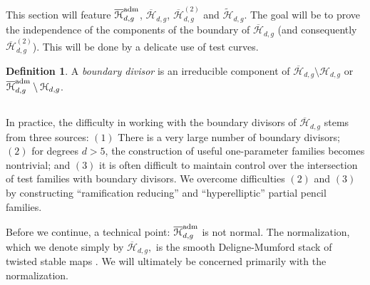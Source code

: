 \documentclass[reqno, 10 pt]{article}
\theoremstyle{definition}
\newtheorem{defn}[thm]{Definition}
\theoremstyle{remark}
\numberwithin{equation}{section}
\numberwithin{thm}{section}
\numberwithin{prop}{section}
\numberwithin{lem}{section}
\numberwithin{cor}{section}
\numberwithin{conj}{section}
\numberwithin{defn}{section}
\renewcommand{\H}{\mathcal H}
\newcommand{\td}{\widetilde}
\newcommand{\Hdg}{\overline{\H}_{d,g}}
\newcommand{\Hdgnt}{\overline{\H}_{d,g}^{(2)}}
\renewcommand{\H}{{\mathcal{H}}}
\begin{document}
\subsection{}
   This section will feature $\overline{ \H}_{d,g}^{\rm{adm}}$, $\Hdg$, $\Hdgnt$ and $\td \H_{d,g}$. The goal will be to prove the independence of the components of the boundary of $\Hdg$ (and consequently $\Hdgnt$). This will be done by a delicate use of test curves. 
  \begin{defn}
  A {\sl boundary divisor} is an irreducible component of $\Hdg \setminus \H_{d,g}$ or $\overline{ \H}_{d,g}^{\rm{adm}} \setminus \H_{d,g}$. 
  \end{defn}

\subsection{} 
  In practice, the difficulty in working with the boundary divisors of $\Hdg$ stems from three sources: $(1)$ There is a very large number of boundary divisors; $(2)$ for degrees $d > 5$, the construction of useful one-parameter families becomes nontrivial; and $(3)$ it is often difficult to maintain control over the intersection of test families with boundary divisors.  We overcome difficulties $(2)$ and $(3)$ by constructing  ``ramification reducing'' and ``hyperelliptic'' partial pencil families. 

    Before we continue, a technical point:  $\overline{\H}_{d,g}^{\rm{adm}}$ is not normal.  The normalization, which we denote simply by $\overline{\H}_{d,g},$ is  the smooth Deligne-Mumford stack of twisted stable maps \cite{acv:03}.  We will ultimately be concerned primarily with the normalization. 
\end{document}
